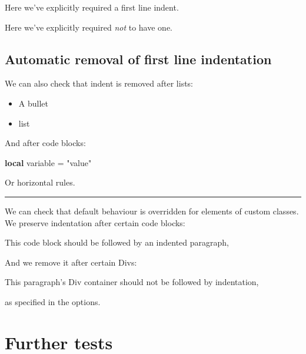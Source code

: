 \documentclass[
]{article}
\newenvironment{Shaded}{}{}
\newcommand{\KeywordTok}[1]{\textcolor[rgb]{0.00,0.44,0.13}{\textbf{#1}}}
\newcommand{\NormalTok}[1]{#1}
\newcommand{\OperatorTok}[1]{\textcolor[rgb]{0.40,0.40,0.40}{#1}}
\newcommand{\StringTok}[1]{\textcolor[rgb]{0.25,0.44,0.63}{#1}}
\newcommand{\VariableTok}[1]{\textcolor[rgb]{0.10,0.09,0.49}{#1}}
\providecommand{\tightlist}{%
  \setlength{\itemsep}{0pt}\setlength{\parskip}{0pt}}
\begin{document}
\noindent Here we've explicitly required a first line indent.

\noindent Here we've explicitly required \emph{not} to have one.

\hypertarget{automatic-removal-of-first-line-indentation}{%
\subsection{Automatic removal of first line
indentation}\label{automatic-removal-of-first-line-indentation}}

We can also check that indent is removed after lists:

\begin{itemize}
\tightlist
\item
  A bullet
\item
  list
\end{itemize}

\noindent And after code blocks:

\begin{Shaded}
\begin{Highlighting}[]
\KeywordTok{local} \VariableTok{variable} \OperatorTok{=} \StringTok{"value"}
\end{Highlighting}
\end{Shaded}

\noindent Or horizontal rules.

\begin{center}\rule{0.5\linewidth}{0.5pt}\end{center}

\noindent We can check that default behaviour is overridden for elements
of custom classes. We preserve indentation after certain code blocks:

\begin{Shaded}
\begin{Highlighting}[]
\NormalTok{This code block should be followed by an indented paragraph,}
\end{Highlighting}
\end{Shaded}

And we remove it after certain Divs:

This paragraph's Div container should not be followed by indentation,

\noindent as specified in the options.

\hypertarget{further-tests}{%
\section{Further tests}\label{further-tests}}
\end{document}
